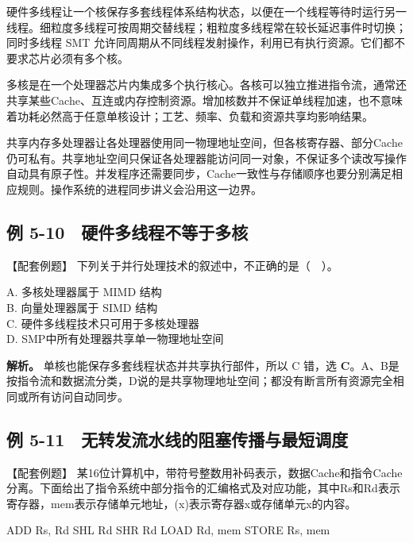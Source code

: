 硬件多线程让一个核保存多套线程体系结构状态，以便在一个线程等待时运行另一线程。细粒度多线程可按周期交替线程；粗粒度多线程常在较长延迟事件时切换；同时多线程 SMT 允许同周期从不同线程发射操作，利用已有执行资源。它们都不要求芯片必须有多个核。

多核是在一个处理器芯片内集成多个执行核心。各核可以独立推进指令流，通常还共享某些Cache、互连或内存控制资源。增加核数并不保证单线程加速，也不意味着功耗必然高于任意单核设计；工艺、频率、负载和资源共享均影响结果。

共享内存多处理器让各处理器使用同一物理地址空间，但各核寄存器、部分Cache仍可私有。共享地址空间只保证各处理器能访问同一对象，不保证多个读改写操作自动具有原子性。并发程序还需要同步，Cache一致性与存储顺序也要分别满足相应规则。操作系统的进程同步讲义会沿用这一边界。

\subsection{例 5-10　硬件多线程不等于多核}\label{CO05-example-10}

【配套例题】 下列关于并行处理技术的叙述中，不正确的是（　）。

A. 多核处理器属于 MIMD 结构\\
B. 向量处理器属于 SIMD 结构\\
C. 硬件多线程技术只可用于多核处理器\\
D. SMP中所有处理器共享单一物理地址空间

\textbf{解析。} 单核也能保存多套线程状态并共享执行部件，所以 C 错，选 \textbf{C}。A、B是按指令流和数据流分类，D说的是共享物理地址空间；都没有断言所有资源完全相同或所有访问自动同步。

\subsection{例 5-11　无转发流水线的阻塞传播与最短调度}\label{CO05-example-11}

【配套例题】 某16位计算机中，带符号整数用补码表示，数据Cache和指令Cache分离。下面给出了指令系统中部分指令的汇编格式及对应功能，其中Rs和Rd表示寄存器，mem表示存储单元地址，(x)表示寄存器x或存储单元x的内容。

\par\medskip\noindent\begin{minipage}{\linewidth}
\begin{codeblock}[language={}]
ADD   Rs, Rd
SHL   Rd
SHR   Rd
LOAD  Rd, mem
STORE Rs, mem
\end{codeblock}
\end{minipage}\par\medskip

